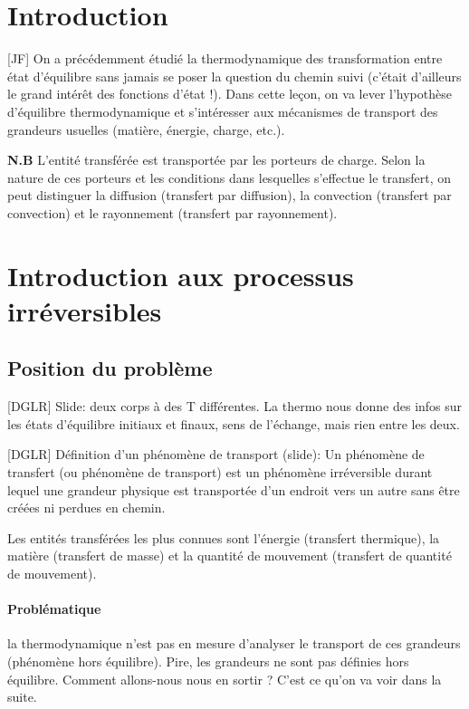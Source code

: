 \documentclass[11pt]{report}
\numberwithin{figure}{section}
\numberwithin{equation}{section}
\numberwithin{table}{section}
\newcommand{\1}{\boldsymbol{1}}
\begin{document}
\section*{Introduction}

[JF] On a précédemment étudié la thermodynamique des transformation
entre état d’équilibre sans jamais se poser la question du chemin suivi (c’était d’ailleurs le grand intérêt des fonctions
d’état !). Dans cette leçon, on va lever l’hypothèse d’équilibre thermodynamique et s’intéresser aux mécanismes de
transport des grandeurs usuelles (matière, énergie, charge, etc.).




\textbf{N.B} L'entité transférée est transportée par les porteurs de charge. Selon la nature de ces porteurs et les conditions dans lesquelles s'effectue le transfert, on peut distinguer la diffusion (transfert par diffusion), la convection (transfert par convection) et le rayonnement (transfert par rayonnement). 


\section{Introduction aux processus irréversibles}

\subsection{Position du problème}

[DGLR] Slide: deux corps à des T différentes. La thermo nous donne des infos sur les états d'équilibre initiaux et finaux, sens de l'échange, mais rien entre les deux.

[DGLR] Définition d'un phénomène de transport (slide): Un phénomène de transfert (ou phénomène de transport) est un phénomène irréversible durant lequel une grandeur physique est transportée d'un endroit vers un autre sans être créées ni perdues en chemin.

Les entités transférées les plus connues sont l'énergie (transfert thermique), la matière (transfert de masse) et la quantité de mouvement (transfert de quantité de mouvement).


\paragraph{Problématique} la thermodynamique n'est pas en mesure d'analyser le transport de ces grandeurs (phénomène hors équilibre). Pire, les grandeurs ne sont pas définies hors équilibre. Comment allons-nous nous en sortir ? C'est ce qu'on va voir dans la suite.
\end{document}
